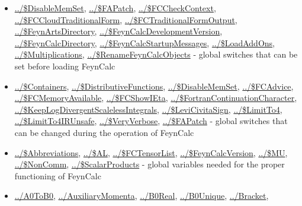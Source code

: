 \documentclass[../FeynCalcManual.tex]{subfiles}
\begin{document}
\begin{itemize}
\tightlist
\item
  \hyperlink{../dollardisablememset}{../\$DisableMemSet},
  \hyperlink{../dollarfapatch}{../\$FAPatch},
  \hyperlink{../dollarfccheckcontext}{../\$FCCheckContext},
  \hyperlink{../dollarfccloudtraditionalform}{../\$FCCloudTraditionalForm},
  \hyperlink{../dollarfctraditionalformoutput}{../\$FCTraditionalFormOutput},
  \hyperlink{../dollarfeynartsdirectory}{../\$FeynArtsDirectory},
  \hyperlink{../dollarfeyncalcdevelopmentversion}{../\$FeynCalcDevelopmentVersion},
  \hyperlink{../dollarfeyncalcdirectory}{../\$FeynCalcDirectory},
  \hyperlink{../dollarfeyncalcstartupmessages}{../\$FeynCalcStartupMessages},
  \hyperlink{../dollarloadaddons}{../\$LoadAddOns},
  \hyperlink{../dollarmultiplications}{../\$Multiplications},
  \hyperlink{../dollarrenamefeyncalcobjects}{../\$RenameFeynCalcObjects}
  - global switches that can be set before loading FeynCalc
\item
  \hyperlink{../dollarcontainers}{../\$Containers},
  \hyperlink{../dollardistributivefunctions}{../\$DistributiveFunctions},
  \hyperlink{../dollardisablememset}{../\$DisableMemSet},
  \hyperlink{../dollarfcadvice}{../\$FCAdvice},
  \hyperlink{../dollarfcmemoryavailable}{../\$FCMemoryAvailable},
  \hyperlink{../dollarfcshowieta}{../\$FCShowIEta},
  \hyperlink{../dollarfortrancontinuationcharacter}{../\$FortranContinuationCharacter},
  \hyperlink{../dollarkeeplogdivergentscalelessintegrals}{../\$KeepLogDivergentScalelessIntegrals},
  \hyperlink{../dollarlevicivitasign}{../\$LeviCivitaSign},
  \hyperlink{../dollarlimitto4}{../\$LimitTo4},
  \hyperlink{../dollarlimitto4irunsafe}{../\$LimitTo4IRUnsafe},
  \hyperlink{../dollarveryverbose}{../\$VeryVerbose},
  \hyperlink{../dollarfapatch}{../\$FAPatch} - global switches that can
  be changed during the operation of FeynCalc
\item
  \hyperlink{../dollarabbreviations}{../\$Abbreviations},
  \hyperlink{../dollaral}{../\$AL},
  \hyperlink{../dollarfctensorlist}{../\$FCTensorList},
  \hyperlink{../dollarfeyncalcversion}{../\$FeynCalcVersion},
  \hyperlink{../dollarmu}{../\$MU},
  \hyperlink{../dollarnoncomm}{../\$NonComm},
  \hyperlink{../dollarscalarproducts}{../\$ScalarProducts} - global
  variables needed for the proper functioning of FeynCalc
\item
  \hyperlink{../a0tob0}{../A0ToB0},
  \hyperlink{../auxiliarymomenta}{../AuxiliaryMomenta},
  \hyperlink{../b0real}{../B0Real},
  \hyperlink{../b0unique}{../B0Unique},
  \hyperlink{../bracket}{../Bracket},

\end{itemize}
\end{document}
